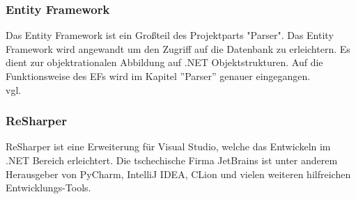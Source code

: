 \subsubsection {Entity Framework}
\label{sec:ef}
Das Entity Framework ist ein Großteil des Projektparts "Parser". Das Entity Framework wird angewandt um den Zugriff auf die Datenbank zu erleichtern. Es dient zur objektrationalen Abbildung auf .NET Objektstrukturen. Auf die Funktionsweise des EFs wird im Kapitel ''Parser'' genauer eingegangen. \\vgl. \textcite{entityframework}
\subsubsection {ReSharper}
\label{sec:ReSharper}
ReSharper ist eine Erweiterung für Visual Studio, welche das Entwickeln im .NET Bereich erleichtert. Die tschechische Firma JetBrains ist unter anderem Herausgeber von PyCharm, IntelliJ IDEA,  CLion und vielen weiteren hilfreichen Entwicklungs-Tools. 
